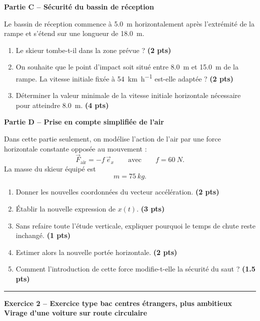 \documentclass[11pt,a4paper]{article}
\newcommand{\vect}[1]{\overrightarrow{#1}}
\newcommand{\e}[1]{\vec{e}_{#1}}
\newcommand{\bareme}[1]{\hfill{\color{blue!70!black}\textbf{(#1 pts)}}}
\begin{document}
\medskip

\textbf{Partie C -- Sécurité du bassin de réception}

Le bassin de réception commence à \SI{5.0}{m} horizontalement après l’extrémité de la rampe et s’étend sur une longueur de \SI{18.0}{m}.

\begin{enumerate}[label=\textbf{C.\arabic*.}, leftmargin=0.9cm]
    \item Le skieur tombe-t-il dans la zone prévue ? \bareme{2}
    \item On souhaite que le point d’impact soit situé entre \SI{8.0}{m} et \SI{15.0}{m} de la rampe. La vitesse initiale fixée à \SI{54}{km.h^{-1}} est-elle adaptée ? \bareme{2}
    \item Déterminer la valeur minimale de la vitesse initiale horizontale nécessaire pour atteindre \SI{8.0}{m}. \bareme{4}
\end{enumerate}

\medskip

\textbf{Partie D -- Prise en compte simplifiée de l’air}

Dans cette partie seulement, on modélise l’action de l’air par une force horizontale constante opposée au mouvement :
\[
\vect{F}_{\text{air}}=-f\,\e{x}
\qquad \text{avec} \qquad
f=\SI{60}{N}.
\]
La masse du skieur équipé est
\[
m=\SI{75}{kg}.
\]

\begin{enumerate}[label=\textbf{D.\arabic*.}, leftmargin=0.9cm]
    \item Donner les nouvelles coordonnées du vecteur accélération. \bareme{2}
    \item Établir la nouvelle expression de $x(t)$. \bareme{3}
    \item Sans refaire toute l’étude verticale, expliquer pourquoi le temps de chute reste inchangé. \bareme{1}
    \item Estimer alors la nouvelle portée horizontale. \bareme{2}
    \item Comment l’introduction de cette force modifie-t-elle la sécurité du saut ? \bareme{1.5}
\end{enumerate}

\vspace{0.4cm}
\hrule
\vspace{0.4cm}

\begin{center}
\textbf{\large Exercice 2 -- Exercice type bac centres étrangers, plus ambitieux}\\
\textbf{Virage d’une voiture sur route circulaire}
\end{center}
\end{document}
